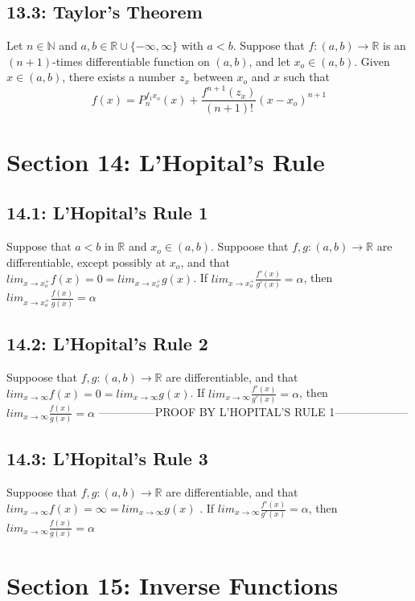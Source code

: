 \documentclass[10pt,letter]{report}
\begin{document}
\section*{13.3: Taylor's Theorem}
Let $n\in\mathbb{N}$ and $a,b\in\mathbb{R}\cup\{-\infty,\infty\}$ with $a<b$. Suppose that $f:(a,b)\rightarrow\mathbb{R}$ is an $(n+1)$-times differentiable function on $(a,b)$, and let $x_o\in(a,b)$. Given $x\in(a,b)$, there exists a number $z_x$ between $x_o$ and $x$ such that $$f(x)=P_n^{f_1x_o}(x) + \frac{f^{n+1}(z_x)}{(n+1)!}(x-x_o)^{n+1}$$



\chapter*{Section 14: L'Hopital's Rule}
\section*{14.1: L'Hopital's Rule 1}
Suppose that $a<b$ in $\mathbb{R}$ and $x_o\in(a,b)$. Suppoose that $f,g:(a,b)\rightarrow\mathbb{R}$ are differentiable, except possibly at $x_o$, and that $lim_{x\rightarrow x_o^+}f(x)=0=lim_{x\rightarrow x_o^+}g(x)$. If $lim_{x\rightarrow x_o^+}\frac{f'(x)}{g'(x)} = \alpha$, then $lim_{x\rightarrow x_o^+}\frac{f(x)}{g(x)} = \alpha$

\section*{14.2: L'Hopital's Rule 2}
Suppoose that $f,g:(a,b)\rightarrow\mathbb{R}$ are differentiable, and that $lim_{x\rightarrow\infty}f(x)=0=lim_{x\rightarrow\infty}g(x)$. If $lim_{x\rightarrow\infty}\frac{f'(x)}{g'(x)} = \alpha$, then $lim_{x\rightarrow\infty}\frac{f(x)}{g(x)} = \alpha$
---------------PROOF BY L'HOPITAL'S RULE 1--------------------

\section*{14.3: L'Hopital's Rule 3}
Suppoose that $f,g:(a,b)\rightarrow\mathbb{R}$ are differentiable, and that $lim_{x\rightarrow\infty}f(x)=\infty=lim_{x\rightarrow\infty}g(x)$ . If $lim_{x\rightarrow\infty}\frac{f'(x)}{g'(x)} = \alpha$, then $lim_{x\rightarrow\infty}\frac{f(x)}{g(x)} = \alpha$



\chapter*{Section 15: Inverse Functions}
\end{document}
